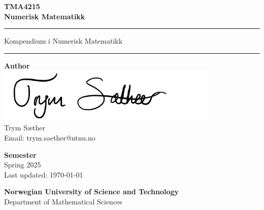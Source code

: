 \begin{titlepage}
    \newcommand{\HRule}{\rule{\linewidth}{1pt}}
    \centering

    \vfill

    {\color{ntnu-blue}\sffamily\bfseries\LARGE TMA4215}\\[0.3cm]
    {\sffamily\bfseries\fontsize{28}{32}\selectfont Numerisk Matematikk}\\[0.5cm]

    \vfill

    {\color{ntnu-lightblue}\HRule}

    \vspace{0.5cm}

    {\color{ntnu-blue}\sffamily\Large Kompendium i Numerisk Matematikk}

    \vspace{0.5cm}

    {\color{ntnu-lightblue}\HRule}

    \vfill

    \begin{minipage}[t]{0.45\textwidth}
        \raggedright
        {\color{ntnu-blue}\sffamily\large\textbf{Author}}\\[0.2cm]
        \includegraphics[width=0.8\textwidth]{figures/TS_Signature.png}\\[0.3cm]
        {\sffamily\large Trym Sæther}\\[0.2cm]
        {\sffamily\large Email: trym.saether@ntnu.no}\\[0.2cm]
    \end{minipage}
    \hfill
    \begin{minipage}[t]{0.45\textwidth}
        \raggedleft
        {\color{ntnu-blue}\sffamily\large\textbf{Semester}}\\[0.2cm]
        {\sffamily\large Spring 2025}\\[0.2cm]
        {\sffamily\large Last updated: \today}
    \end{minipage}

    {\color{ntnu-blue}\sffamily\bfseries\Large Norwegian University of Science and Technology}\\[0.2cm]
    {\sffamily\large Department of Mathematical Sciences}

    \vspace{1cm}
\end{titlepage}

